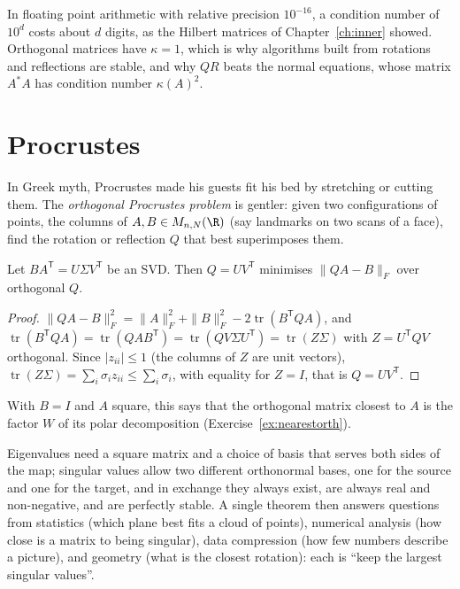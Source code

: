 In floating point arithmetic with relative precision $10^{-16}$, a condition number of $10^{d}$ costs about $d$ digits, as
the Hilbert matrices of Chapter~\ref{ch:inner} showed. Orthogonal matrices have $\kappa=1$, which is why algorithms built from
rotations and reflections are stable, and why $QR$ beats the normal equations, whose matrix $A^*A$ has condition number
$\kappa(A)^2$.

\section{Procrustes}

In Greek myth, Procrustes made his guests fit his bed by stretching or cutting them. The \emph{orthogonal Procrustes problem}
is gentler: given two configurations of points, the columns of $A,B\in M_{n,N}(\R)$ (say landmarks on two scans of a face),
find the rotation or reflection $Q$ that best superimposes them.

\begin{theorem}\label{thm:procrustes}
Let $BA^{\mathsf T}=U\Sigma V^{\mathsf T}$ be an SVD. Then $Q=UV^{\mathsf T}$ minimises $\|QA-B\|_F$ over orthogonal $Q$.
\end{theorem}
\begin{proof}
$\|QA-B\|_F^2=\|A\|_F^2+\|B\|_F^2-2\operatorname{tr}(B^{\mathsf T}QA)$, and $\operatorname{tr}(B^{\mathsf T}QA)=\operatorname{tr}(QAB^{\mathsf T})
=\operatorname{tr}(QV\Sigma U^{\mathsf T})=\operatorname{tr}(Z\Sigma)$ with $Z=U^{\mathsf T}QV$ orthogonal. Since $|z_{ii}|\le1$
(the columns of $Z$ are unit vectors), $\operatorname{tr}(Z\Sigma)=\sum_i\sigma_iz_{ii}\le\sum_i\sigma_i$, with equality for
$Z=I$, that is $Q=UV^{\mathsf T}$.
\end{proof}

With $B=I$ and $A$ square, this says that the orthogonal matrix closest to $A$ is the factor $W$ of its polar decomposition
(Exercise~\ref{ex:nearestorth}).

\begin{beauty}
Eigenvalues need a square matrix and a choice of basis that serves both sides of the map; singular values allow two
different orthonormal bases, one for the source and one for the target, and in exchange they always exist, are always real
and non-negative, and are perfectly stable. A single theorem then answers questions from statistics (which plane best fits a
cloud of points), numerical analysis (how close is a matrix to being singular), data compression (how few numbers describe a
picture), and geometry (what is the closest rotation): each is ``keep the largest singular values''.
\end{beauty}


